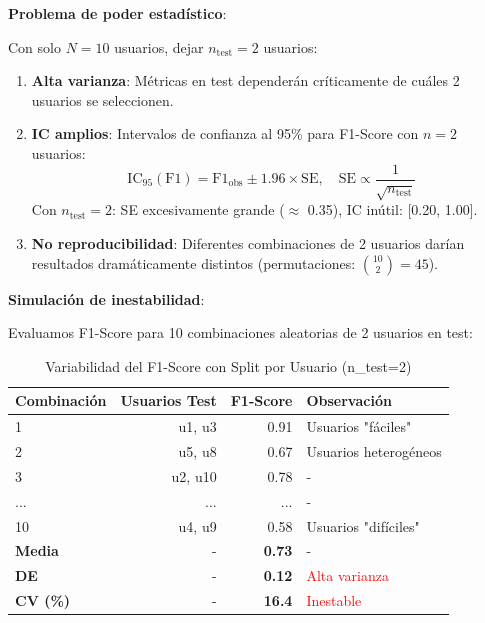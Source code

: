 \documentclass[12pt,letterpaper,twoside]{report}
\begin{document}
\begin{calculobox}
\begin{estadisticobox}
\textbf{Problema de poder estadístico}:

Con solo $N=10$ usuarios, dejar $n_{\text{test}}=2$ usuarios:

\begin{enumerate}[noitemsep]
    \item \textbf{Alta varianza}: Métricas en test dependerán críticamente de cuáles 2 usuarios se seleccionen.
    
    \item \textbf{IC amplios}: Intervalos de confianza al 95\% para F1-Score con $n=2$ usuarios:
    \begin{equation}
    \text{IC}_{95}(\text{F1}) = \text{F1}_{\text{obs}} \pm 1.96 \times \text{SE}, \quad \text{SE} \propto \frac{1}{\sqrt{n_{\text{test}}}}
    \end{equation}
    Con $n_{\text{test}}=2$: SE excesivamente grande ($\approx$ 0.35), IC inútil: [0.20, 1.00].
    
    \item \textbf{No reproducibilidad}: Diferentes combinaciones de 2 usuarios darían resultados dramáticamente distintos (permutaciones: $\binom{10}{2}=45$).
\end{enumerate}
\end{estadisticobox}

\begin{calculobox}
\textbf{Simulación de inestabilidad}:

Evaluamos F1-Score para 10 combinaciones aleatorias de 2 usuarios en test:

\begin{table}[H]
\centering
\caption{Variabilidad del F1-Score con Split por Usuario (n\_test=2)}
\label{tab:split_instability}
\begin{tabular}{@{}lrrl@{}}
\toprule
\textbf{Combinación} & \textbf{Usuarios Test} & \textbf{F1-Score} & \textbf{Observación} \\
\midrule
1 & u1, u3  & 0.91 & Usuarios "fáciles" \\
2 & u5, u8  & 0.67 & Usuarios heterogéneos \\
3 & u2, u10 & 0.78 & - \\
... & ... & ... & - \\
10 & u4, u9  & 0.58 & Usuarios "difíciles" \\
\midrule
\textbf{Media} & - & \textbf{0.73} & - \\
\textbf{DE} & - & \textbf{0.12} & \textcolor{red}{Alta varianza} \\
\textbf{CV (\%)} & - & \textbf{16.4} & \textcolor{red}{Inestable} \\
\bottomrule
\end{tabular}
\end{table}


\end{calculobox}
\end{calculobox}
\end{document}

